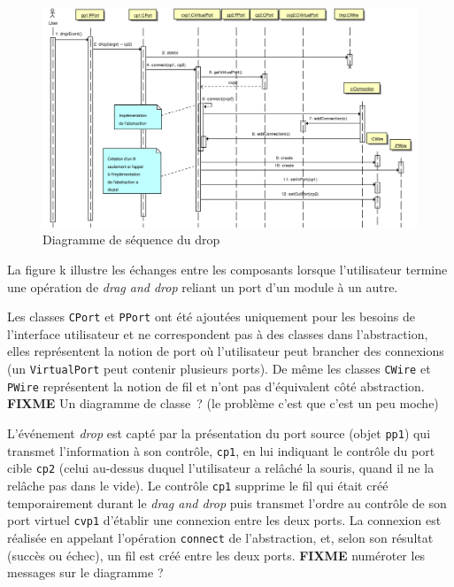 \begin{figure}[htb]
\centering
\includegraphics[width=17cm]{../img/ps/drop-sequence.pdf}
\caption{Diagramme de séquence du drop}
\end{figure}

La figure k illustre les échanges entre les composants lorsque
l'utilisateur termine une opération de \emph{drag and drop} reliant
un port d'un module à un autre.

Les classes \verb!CPort! et \verb!PPort! ont été ajoutées
uniquement pour les besoins de l'interface utilisateur et ne
correspondent pas à des classes dans l'abstraction, elles
représentent la notion de port où l'utilisateur peut brancher des
connexions (un \verb!VirtualPort! peut contenir plusieurs ports).
De même les classes \verb!CWire! et \verb!PWire! représentent la
notion de fil et n'ont pas d'équivalent côté abstraction.
\textbf{FIXME} Un diagramme de classe~? (le problème c'est que
c'est un peu moche)

L'événement \emph{drop} est capté par la présentation du port
source (objet \verb!pp1!) qui transmet l'information à son
contrôle, \verb!cp1!, en lui indiquant le contrôle du port cible
\verb!cp2! (celui au-dessus duquel l'utilisateur a relâché la
souris, quand il ne la relâche pas dans le vide). Le contrôle
\verb!cp1! supprime le fil qui était créé temporairement durant le
\emph{drag and drop} puis transmet l'ordre au contrôle de son port
virtuel \verb!cvp1! d'établir une connexion entre les deux ports.
La connexion est réalisée en appelant l'opération \verb!connect! de
l'abstraction, et, selon son résultat (succès ou échec), un fil est
créé entre les deux ports. \textbf{FIXME} numéroter les messages
sur le diagramme ?

